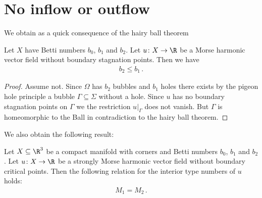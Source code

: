 \section{No inflow or outflow}
We obtain as a quick consequence of the hairy ball theorem
\begin{proposition}
  Let $X$ have Betti numbers $b_0$, $b_1$ and $b_2$.
  Let $u\colon X\to\R$
  be a Morse harmonic vector field without boundary stagnation points. Then we have
  \begin{align*}
    b_2\leq b_1\,.
  \end{align*}
\end{proposition}
\begin{proof} 
  Assume not. Since $\Omega$ has $b_2$ bubbles and $b_1$ holes there exists by the pigeon hole
  principle a bubble $\Gamma\subseteq\Sigma$ without a hole. Since $u$ has no boundary stagnation points on $\Gamma$ we
  the restriction $u\vert_\Gamma$ does not vanish. But $\Gamma$ is homeomorphic to the Ball in contradiction to the hairy ball theorem.
\end{proof}
We also obtain the following result:
\begin{proposition}
  Let $X\subseteq\R^3$ be a compact manifold with corners and Betti numbers $b_0$, $b_1$ and $b_2$.
  Let $u\colon X\to\R$ be a strongly Morse harmonic vector field without boundary critical points.
  Then the following relation for
  the interior type numbers of $u$ holds:
  \begin{align*}
    M_1=M_2\,.
  \end{align*}
\end{proposition}
